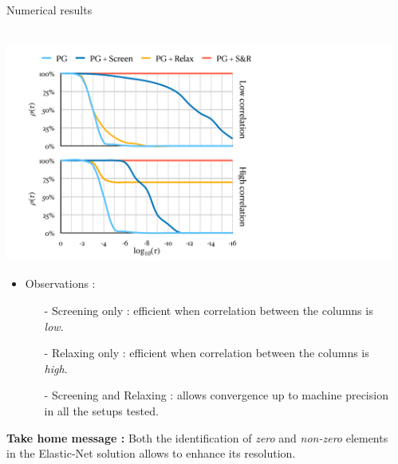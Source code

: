 \documentclass[final]{beamer}
\newcommand{\emphone}[1]{\textit{\color{norange}#1}}
\newlength{\sepwid}
\newlength{\onecolwid}
\begin{document}
\begin{frame}[t]
\begin{columns}[t]
\begin{column}{\onecolwid}
\begin{block}{Numerical results}
\begin{itemize}
    \end{itemize}
    ~\\
    \hspace*{-2em}\includegraphics[width=1.7\linewidth]{plot.pdf}
    
    \begin{itemize}
        \item \hspace{0.1in} Observations :
        \begin{itemize}
            \normalsize \item[-] \hspace{0.1in} \normalsize Screening only : efficient when correlation between the columns is \emphone{low}.
            \item[-] \hspace{0.1in} \normalsize Relaxing only : efficient when correlation between the columns is \emphone{high}.
            \item[-] \hspace{0.1in} \normalsize Screening and Relaxing : allows convergence up to machine precision in all the setups tested.
        \end{itemize}
    \end{itemize}
    \vspace{1em}
    \textbf{Take home message :} Both the identification of \emphone{zero} and \emphone{non-zero} elements in the Elastic-Net solution allows to enhance its resolution.

\end{block}

\end{column} 

\begin{column}{\sepwid}\end{column}

\end{columns}
\end{frame}
\end{document}
